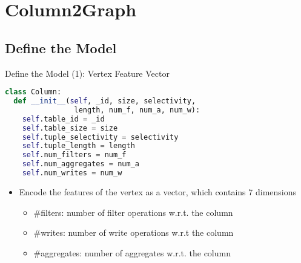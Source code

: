 \documentclass{beamer}
\begin{document}
\section{Column2Graph}
\subsection{Define the Model}
\begin{frame}[fragile]{Define the Model (1): Vertex Feature Vector}
    \begin{minipage}{1.0\linewidth}
\begin{lstlisting}[language=Python]
class Column:
  def __init__(self, _id, size, selectivity,
                length, num_f, num_a, num_w):
    self.table_id = _id
    self.table_size = size
    self.tuple_selectivity = selectivity
    self.tuple_length = length
    self.num_filters = num_f
    self.num_aggregates = num_a
    self.num_writes = num_w
\end{lstlisting}
    \end{minipage}\hspace{0cm}
    \begin{minipage}{1.0\linewidth}
        \begin{itemize}
            \item Encode the features of the vertex as a vector, which contains 7 dimensions
            \begin{itemize}
                \item #filters: number of filter operations w.r.t. the column
                \item #writes: number of write operations w.r.t the column
                \item #aggregates: number of aggregates w.r.t. the column
            \end{itemize}
        \end{itemize}
    \end{minipage}
\end{frame}
\end{document}
